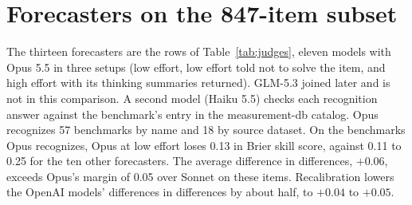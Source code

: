\documentclass{article}
\begin{document}
\section{Forecasters on the 847-item subset}
\label{app:judges}

The thirteen forecasters are the rows of Table~\ref{tab:judges}, eleven models with Opus 5.5 in three setups (low effort, low effort told not to solve the item, and high effort with its thinking summaries returned). GLM-5.3 joined later and is not in this comparison. A second model (Haiku 5.5) checks each recognition answer against the benchmark's entry in the measurement-db catalog. Opus recognizes 57 benchmarks by name and 18 by source dataset. On the benchmarks Opus recognizes, Opus at low effort loses 0.13 in Brier skill score, against 0.11 to 0.25 for the ten other forecasters. The average difference in differences, $+0.06$, exceeds Opus's margin of 0.05 over Sonnet on these items. Recalibration lowers the OpenAI models' differences in differences by about half, to $+0.04$ to $+0.05$.
\end{document}
